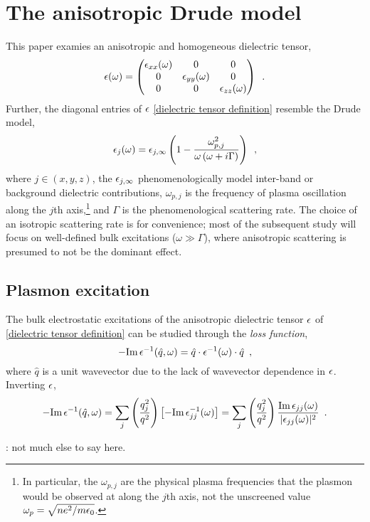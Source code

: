 \section{The anisotropic Drude model}

This paper examies an anisotropic and homogeneous dielectric tensor,
\begin{equation}
    \label{dielectric tensor definition}
    \epsilon(\omega) = \begin{pmatrix}
    \epsilon_{xx}(\omega) & 0 & 0
    \\ 0 & \epsilon_{yy}(\omega) & 0
    \\ 0 & 0 & \epsilon_{zz}(\omega)
    \end{pmatrix}
    \,\,\,.
\end{equation}
Further, the diagonal entries of $\epsilon$ \eqref{dielectric tensor definition} resemble the Drude model,
\begin{equation}
    \label{dielectric component Drude definition}
    \epsilon_j(\omega) = \epsilon_{j,\infty}\left( 1-\frac{\omega_{p,j}^2}{\omega\left(\omega+i\Gamma\right)}\right)\,\,\,,
\end{equation}
where $j\in(x,y,z)$, the $\epsilon_{j,\infty}$ phenomenologically model inter-band or background dielectric contributions, $\omega_{p,j}$ is the frequency of plasma oscillation along the $j$th axis,\footnote{In particular, the $\omega_{p,j}$ are the physical plasma frequencies that the plasmon would be observed at along the $j$th axis, not the unscreened value $\omega_p=\sqrt{ne^2/m\epsilon_0}$.} and $\Gamma$ is the phenomenological scattering rate.  The choice of an isotropic scattering rate is for convenience; most of the subsequent study will focus on well-defined bulk excitations ($\omega\gg\Gamma$), where anisotropic scattering is presumed to not be the dominant effect.





\subsection{Plasmon excitation}

The bulk electrostatic excitations of the anisotropic dielectric tensor $\epsilon$ of \eqref{dielectric tensor definition} can be studied through the {\it loss function},
\begin{equation}
    -\text{Im}\, \epsilon^{-1}(\hat q, \omega) = \hat q \cdot \epsilon^{-1}(\omega) \cdot \hat q
    \,\,\,,
\end{equation}
where $\hat q$ is a unit wavevector due to the lack of wavevector dependence in $\epsilon$.  Inverting $\epsilon$,
\begin{equation}
    \label{bulk loss function}
    -\text{Im}\,\epsilon^{-1}(\hat q, \omega) = \sum_j \left(\frac{q_j^2}{q^2}\right) \left[ -\text{Im}\,\epsilon_{jj}^{-1}(\omega)\right]
    =
    \sum_j\left(\frac{q_j^2}{q^2}\right)\frac{\text{Im}\,\epsilon_{jj}(\omega)}{|\epsilon_{jj}(\omega)|^2}
    \,\,\,.
\end{equation}

: not much else to say here.
